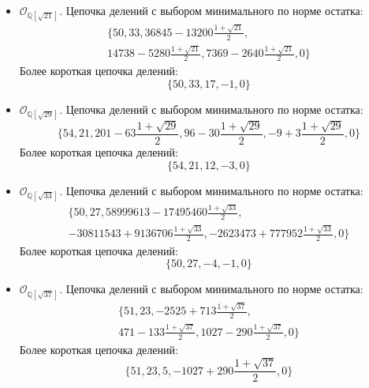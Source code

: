 \documentclass[_00_dissertation.tex]{subfiles}
\begin{document}
\begin{itemize}
    \item $\mathcal{O}_{\mathbb{Q}[\sqrt{21}]}$.
    Цепочка делений с выбором минимального по норме остатка:
    \begin{multline*}
      \{50, 33, 36845-13200\frac{1+\sqrt{21}}{2},\\
      14738-5280\frac{1+\sqrt{21}}{2}, 7369-2640\frac{1+\sqrt{21}}{2}, 0\}
    \end{multline*}
    Более короткая цепочка делений:
    \begin{equation*}
        \{50, 33, 17, -1, 0\}
    \end{equation*}

    \item $\mathcal{O}_{\mathbb{Q}[\sqrt{29}]}$.
    Цепочка делений с выбором минимального по норме остатка:
    \begin{equation*}
        \{54, 21, 201-63\frac{1+\sqrt{29}}{2}, 96-30\frac{1+\sqrt{29}}{2}, -9+3\frac{1+\sqrt{29}}{2}, 0\}
    \end{equation*}
    Более короткая цепочка делений:
    \begin{equation*}
        \{54, 21, 12, -3, 0\}
    \end{equation*}

    \item $\mathcal{O}_{\mathbb{Q}[\sqrt{33}]}$.
    Цепочка делений с выбором минимального по норме остатка:
    \begin{multline*}
        \{50, 27, 58999613-17495460\frac{1+\sqrt{33}}{2},\\
        -30811543+9136706\frac{1+\sqrt{33}}{2}, -2623473+777952\frac{1+\sqrt{33}}{2}, 0\}
    \end{multline*}
    Более короткая цепочка делений:
    \begin{equation*}
        \{50, 27, -4, -1, 0\}
    \end{equation*}

    \item $\mathcal{O}_{\mathbb{Q}[\sqrt{37}]}$.
    Цепочка делений с выбором минимального по норме остатка:
    \begin{multline*}
        \{51, 23, -2525+713\frac{1+\sqrt{37}}{2},\\
        471-133\frac{1+\sqrt{37}}{2}, 1027-290\frac{1+\sqrt{37}}{2}, 0\}
    \end{multline*}
    Более короткая цепочка делений:
    \begin{equation*}
        \{51, 23, 5, -1027+290\frac{1+\sqrt{37}}{2}, 0\}
    \end{equation*}


\end{itemize}
\end{document}

